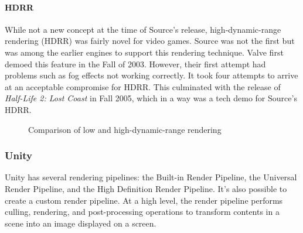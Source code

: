 \documentclass[a4paper, 12pt]{scrartcl}
\begin{document}
\paragraph{HDRR}
While not a new concept at the time of Source's release, high-dynamic-range rendering (HDRR) was fairly novel for video games. Source was not the first but was among the earlier engines to support this rendering technique. Valve first demoed this feature in the Fall of 2003. However, their first attempt had problems such as fog effects not working correctly. It took four attempts to arrive at an acceptable compromise for HDRR. This culminated with the release of \textit{Half-Life 2: Lost Coast} in Fall 2005, which in a way was a tech demo for Source's HDRR.

\begin{figure}[!ht]
  \centering
  \qquad
  \caption{Comparison of low and high-dynamic-range rendering}
  \label{fig:source_hdrr}
\end{figure}

\subsubsection{Unity}
Unity has several rendering pipelines: the Built-in Render Pipeline, the Universal Render Pipeline, and the High Definition Render Pipeline. It's also possible to create a custom render pipeline. At a high level, the render pipeline performs culling, rendering, and post-processing operations to transform contents in a scene into an image displayed on a screen.
\end{document}
